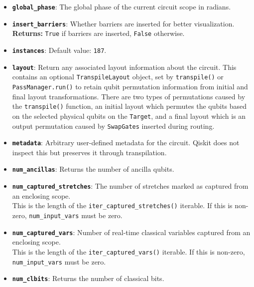 \begin{itemize}
    \item \textbf{\texttt{global\_phase}}: The global phase of the current circuit scope in radians.

    \item \textbf{\texttt{insert\_barriers}}: Whether barriers are inserted for better visualization.\\
    \textbf{Returns:} \texttt{True} if barriers are inserted, \texttt{False} otherwise.

    \item \textbf{\texttt{instances}}: Default value: \texttt{187}.

    \item \textbf{\texttt{layout}}: Return any associated layout information about the circuit. This contains an optional \texttt{TranspileLayout} object, set by \texttt{transpile()} or \texttt{PassManager.run()} to retain qubit permutation information from initial and final layout transformations. There are two types of permutations caused by the \texttt{transpile()} function, an initial layout which permutes the qubits based on the selected physical qubits on the \texttt{Target}, and a final layout which is an output permutation caused by \texttt{SwapGates} inserted during routing.

    \item \textbf{\texttt{metadata}}: Arbitrary user-defined metadata for the circuit. Qiskit does not inspect this but preserves it through transpilation.

    \item \textbf{\texttt{num\_ancillas}}: Returns the number of ancilla qubits.

    \item \textbf{\texttt{num\_captured\_stretches}}: The number of stretches marked as captured from an enclosing scope.\\
    This is the length of the \texttt{iter\_captured\_stretches()} iterable. If this is non-zero, \texttt{num\_input\_vars} must be zero.

    \item \textbf{\texttt{num\_captured\_vars}}: Number of real-time classical variables captured from an enclosing scope.\\
    This is the length of the \texttt{iter\_captured\_vars()} iterable. If this is non-zero, \texttt{num\_input\_vars} must be zero.

    \item \textbf{\texttt{num\_clbits}}: Returns the number of classical bits.


\end{itemize}
